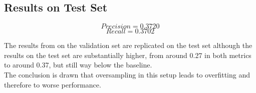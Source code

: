 
\subsection{Results on Test Set}

\begin{equation}
Precision = 0.3720
\end{equation}
\begin{equation}
Recall = 0.3702
\end{equation}

The results from on the validation set are replicated on the test set although the results on the test set are substantially higher, from around 0.27 in both metrics to around 0.37, but still way below the baseline. \\
The conclusion is drawn that oversampling in this setup leads to overfitting and therefore to worse performance. 
